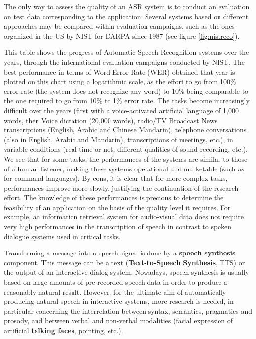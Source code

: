 \documentclass[]{../metanetpaper}
\begin{document}
\begin{multicols}{2}
The only way to assess the quality of an ASR system is to conduct an
evaluation on test data corresponding to the application. Several
systems based on different approaches may be compared within
evaluation campaigns, such as the ones organized in the US by NIST for
DARPA since 1987 (see figure \ref{fig:nistreco}).  

This table shows the progress of Automatic Speech Recognition systems
over the years, through the international evaluation campaigns
conducted by NIST.  The best performance in terms of Word Error Rate
(WER) obtained that year is plotted on this chart using a logarithmic
scale, as the effort to go from 100\% error rate (the system does not
recognize any word) to 10\% being comparable to the one required to go
from 10\% to 1\% error rate. The tasks become increasingly difficult
over the years (first with a voice-activated artificial language of
1,000 words, then Voice dictation (20,000 words), radio/TV Broadcast
News transcriptions (English, Arabic and Chinese Mandarin), telephone
conversations (also in English, Arabic and Mandarin), transcriptions
of meetings, etc.), in variable conditions (real time or not,
different qualities of sound recording, etc.). We see that for some
tasks, the performances of the systems are similar to those of a human
listener, making these systems operational and marketable (such as for
command languages). By cons, it is clear that for more complex tasks,
performances improve more slowly, justifying the continuation of the
research effort. The knowledge of these performances is precious to
determine the feasibility of an application on the basis of the
quality level it requires. For example, an information retrieval
system for audio-visual data does not require very high performances
in the transcription of speech in contrast to spoken dialogue systems
used in critical tasks.

Transforming a message into a speech signal is done by a {\bf speech
synthesis} component. This message can be a text ({\bf Text-to-Speech
Synthesis}, TTS) or the output of an interactive dialog system. Nowadays,
speech synthesis is usually based on large amounts of pre-recorded
speech data in order to produce a reasonably natural result. However,
for the ultimate aim of automatically producing natural speech in
interactive systems, more research is needed, in particular concerning
the interrelation between syntax, semantics, pragmatics and prosody,
and between verbal and non-verbal modalities (facial expression of
artificial {\bf talking faces}, pointing, etc.).


\end{multicols}
\end{document}
